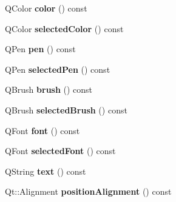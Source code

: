 \begin{DoxyCompactItemize}
\item 
Q\+Color {\bfseries color} () const \hypertarget{class_q_c_p_item_text_ac9cb0a8a27f64d1b40855910ea9ebd03}{}\label{class_q_c_p_item_text_ac9cb0a8a27f64d1b40855910ea9ebd03}

\item 
Q\+Color {\bfseries selected\+Color} () const \hypertarget{class_q_c_p_item_text_a44f690ec0ba6a32e518f2e923c002e39}{}\label{class_q_c_p_item_text_a44f690ec0ba6a32e518f2e923c002e39}

\item 
Q\+Pen {\bfseries pen} () const \hypertarget{class_q_c_p_item_text_a552bd02f46dbcb4b4812559036893352}{}\label{class_q_c_p_item_text_a552bd02f46dbcb4b4812559036893352}

\item 
Q\+Pen {\bfseries selected\+Pen} () const \hypertarget{class_q_c_p_item_text_a70c86ec95133d3e904d1718023fe3c4e}{}\label{class_q_c_p_item_text_a70c86ec95133d3e904d1718023fe3c4e}

\item 
Q\+Brush {\bfseries brush} () const \hypertarget{class_q_c_p_item_text_a38b981dfacb703efa8e27346eebcb5a2}{}\label{class_q_c_p_item_text_a38b981dfacb703efa8e27346eebcb5a2}

\item 
Q\+Brush {\bfseries selected\+Brush} () const \hypertarget{class_q_c_p_item_text_ac6802bbceff1ade0053166c64a5a6966}{}\label{class_q_c_p_item_text_ac6802bbceff1ade0053166c64a5a6966}

\item 
Q\+Font {\bfseries font} () const \hypertarget{class_q_c_p_item_text_ad34943fd68a9b1451d3e3234d072e418}{}\label{class_q_c_p_item_text_ad34943fd68a9b1451d3e3234d072e418}

\item 
Q\+Font {\bfseries selected\+Font} () const \hypertarget{class_q_c_p_item_text_af2e7cacb1975132508714a51c5f48c3b}{}\label{class_q_c_p_item_text_af2e7cacb1975132508714a51c5f48c3b}

\item 
Q\+String {\bfseries text} () const \hypertarget{class_q_c_p_item_text_a9547f7832010486abed0837e75db5330}{}\label{class_q_c_p_item_text_a9547f7832010486abed0837e75db5330}

\item 
Qt\+::\+Alignment {\bfseries position\+Alignment} () const \hypertarget{class_q_c_p_item_text_af13c6adc480f268116ae72196eb44b06}{}\label{class_q_c_p_item_text_af13c6adc480f268116ae72196eb44b06}


\end{DoxyCompactItemize}
